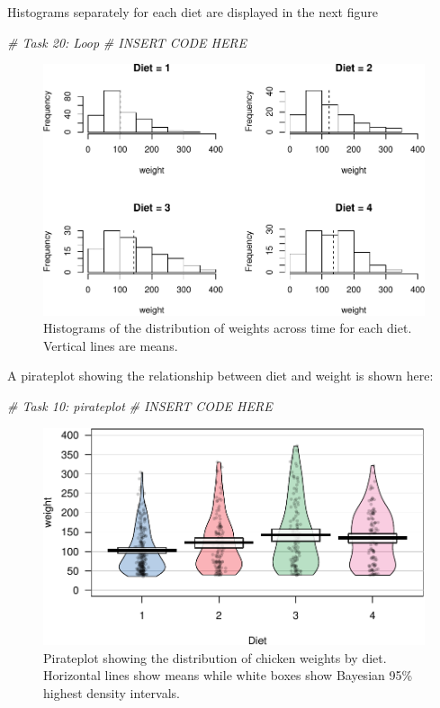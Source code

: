 \documentclass[english,man]{apa6}
\newenvironment{Shaded}{\begin{snugshade}}{\end{snugshade}}
\newcommand{\CommentTok}[1]{\textcolor[rgb]{0.56,0.35,0.01}{\textit{{#1}}}}
\begin{document}
Histograms separately for each diet are displayed in the next figure

\begin{Shaded}
\begin{Highlighting}[]
\CommentTok{# Task 20: Loop}
\CommentTok{# INSERT CODE HERE}
\end{Highlighting}
\end{Shaded}

\begin{figure}[htbp]
\centering
\includegraphics{finalpaper_example_files/figure-latex/unnamed-chunk-20-1.pdf}
\caption{\label{fig:unnamed-chunk-20}Histograms of the distribution of
weights across time for each diet. Vertical lines are means.}
\end{figure}

A pirateplot showing the relationship between diet and weight is shown
here:

\begin{Shaded}
\begin{Highlighting}[]
\CommentTok{# Task 10: pirateplot}
\CommentTok{# INSERT CODE HERE}
\end{Highlighting}
\end{Shaded}

\begin{figure}[htbp]
\centering
\includegraphics{finalpaper_example_files/figure-latex/unnamed-chunk-22-1.pdf}
\caption{\label{fig:unnamed-chunk-22}Pirateplot showing the distribution of
chicken weights by diet. Horizontal lines show means while white boxes
show Bayesian 95\% highest density intervals.}
\end{figure}
\end{document}
